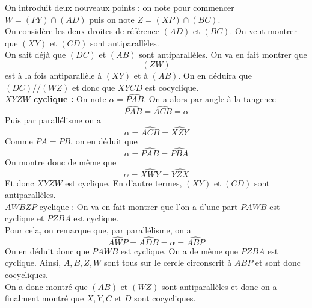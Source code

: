 \begin{sol}
On introduit deux nouveaux points : on note pour commencer $W=(PY)\cap (AD)$ puis on note $Z=(XP)\cap (BC)$. \\
On considère les deux droites de référence $(AD)$ et $(BC)$. On veut montrer que $(XY)$ et $(CD)$ sont antiparallèles. \\
On sait déjà que $(DC)$ et $(AB)$ sont antiparallèles. On va en fait montrer que
$$(ZW)$$
est à la fois antiparallèle à $(XY)$ et à $(AB)$. On en déduira que $(DC)//(WZ)$ et donc que $XYCD$ est cocyclique. \\
\textbf{$XYZW$ cyclique :} On note $\alpha = \widehat{PAB}$. On a alors par angle à la tangence
$$\widehat{PAB}=\widehat{ACB}=\alpha $$
Puis par parallélisme on a
$$\alpha=\widehat{ACB}=\widehat{XZY} $$
Comme $PA=PB$, on en déduit que
$$\alpha=\widehat{PAB}=\widehat{PBA} $$
On montre donc de même que
$$\alpha=\widehat{XWY}=\widehat{YZX} $$
Et donc $XYZW$ est cyclique. En d'autre termes, $(XY)$ et $(CD)$ sont antiparallèles. \\
$AWBZP$ cyclique : On va en fait montrer que l'on a d'une part $PAWB$ est cyclique et $PZBA$ est cyclique. \\
Pour cela, on remarque que, par parallélisme, on a
$$\widehat{AWP} = \widehat{ADB} = \alpha = \widehat{ABP} $$
On en déduit donc que $PAWB$ est cyclique. On a de même que $PZBA$ est cyclique. Ainsi, $A,B,Z,W$ sont tous sur le cercle circonscrit à $ABP$ et sont donc cocycliques. \\
On a donc montré que $(AB)$ et $(WZ)$ sont antiparallèles et donc on a finalment montré que $X,Y,C$ et $D$ sont cocycliques.
\end{sol}